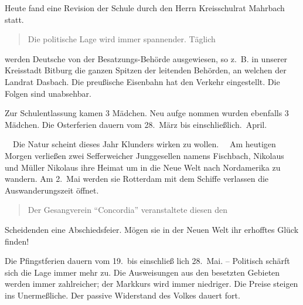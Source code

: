 

%
Heute fand eine Revision der Schule durch den Herrn\ob
Kreisschulrat Mahrbach statt.

\pend
\begin{verse}
Die politische Lage wird immer spannender. Täglich
\end{verse}
\pstart
werden Deutsche von der Besatzungs-Behörde ausgewiesen,\ob
so z.\ B. in unserer Kreisstadt Bitburg die ganzen Spitzen\ob
der leitenden Behörden, an welchen der Landrat Dasbach.\ob
Die preußische Eisenbahn hat den Verkehr eingestellt.\ob
Die Folgen sind unabsehbar.

%
Zur Schulentlassung kamen 3 Mädchen. Neu aufge\ohb
nommen wurden ebenfalls 3 Mädchen.\ob
Die Osterferien dauern vom 28.\ März bis einschließlich.\ April.

%
~~Die Natur scheint dieses Jahr Klunders wirken zu\ob
wollen.~~\ob
Am heutigen Morgen verließen zwei Sefferweicher\ob
Junggesellen namens Fischbach, Nikolaus und Müller\ob
Nikolaus ihre Heimat um in die Neue Welt nach\ob
Nordamerika zu wandern. Am 2.\ Mai werden sie\ob
Rotterdam mit dem Schiffe                    verlassen\ob
die Auswanderungszeit öffnet.

\pend
\begin{verse}
Der Gesangverein \enquote{Concordia} veranstaltete diesen den
\end{verse}
\pstart
Scheidenden eine Abschiedsfeier. Mögen sie in der Neuen\ob
Welt ihr erhofftes Glück finden!

%
Die Pfingstferien dauern vom 19.\ bis einschließ\ohb
lich 28.\ Mai. -- Politisch schärft sich die Lage immer\ob
mehr zu. Die Ausweisungen aus den besetzten Gebieten\ob
werden immer zahlreicher; der Markkurs wird immer\ob
niedriger. Die Preise steigen ins Unermeßliche. Der\ob
passive Widerstand des Volkes dauert fort.
\pend

